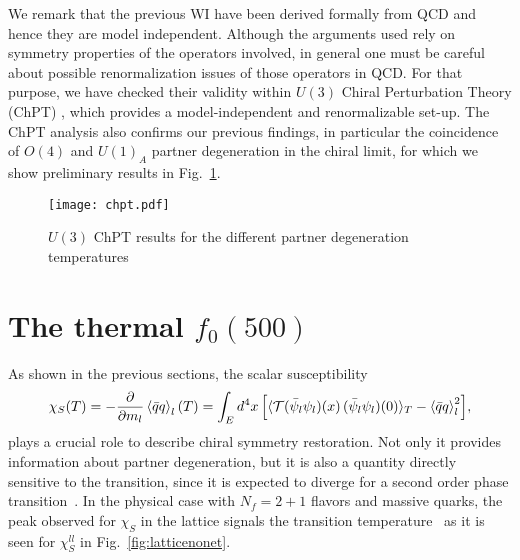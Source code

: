 \documentclass{PoS}
\newcommand{\condl}{\mean{\bar q q}_l}
\newcommand{\mean}[1]{\left\langle{#1}\right\rangle}
\newcommand{\quarkcorT}{\langle {\cal T} (\bar \psi_l\psi_l)(x) \,(\bar \psi_l
 \psi_l)(0)\rangle_{T}}
\begin{document}
We remark that the previous WI have been derived formally from QCD and hence they are model independent. 
Although the arguments used rely on symmetry properties of the operators involved, in general one must be careful about possible renormalization issues of those operators in QCD. 
For that purpose, we have checked their validity within  $U(3)$ Chiral Perturbation Theory (ChPT) \cite{Nicola:2016jlj,AGNJREnext}, which provides a model-independent and renormalizable set-up. The ChPT analysis also confirms our previous findings, in particular the coincidence of $O(4)$ and $U(1)_A$ partner degeneration in the chiral limit, for which we show preliminary results in Fig.~\ref{fig:chpt}. 
\begin{figure}
\centerline{\texttt{[image: chpt.pdf]}}
\caption{$U(3)$ ChPT results for the different partner degeneration temperatures}
\label{fig:chpt}
\end{figure}

\section{The thermal $f_0(500)$}
As shown in the previous sections, the scalar susceptibility
\begin{equation}
\chi_S (T)=-\frac{\partial}{\partial m_l} \condl(T)=\int_E{d^4x \left[\quarkcorT-\condl^2\right]},
\end{equation}
plays a crucial role to describe chiral symmetry restoration. 
Not only it provides information about partner degeneration, but it is also a quantity directly sensitive to the transition, since it is expected to diverge for a second order phase transition~\cite{Smilga:1995qf}. 
In the physical case with $N_f=2+1$ flavors and massive quarks, the peak observed for $\chi_S$ in the lattice signals the transition temperature~\cite{Aoki:2009sc,Bazavov:2011nk,Buchoff:2013nra} as it is seen for $\chi_S^{ll}$ in Fig.~\ref{fig:latticenonet}.  
\end{document}

